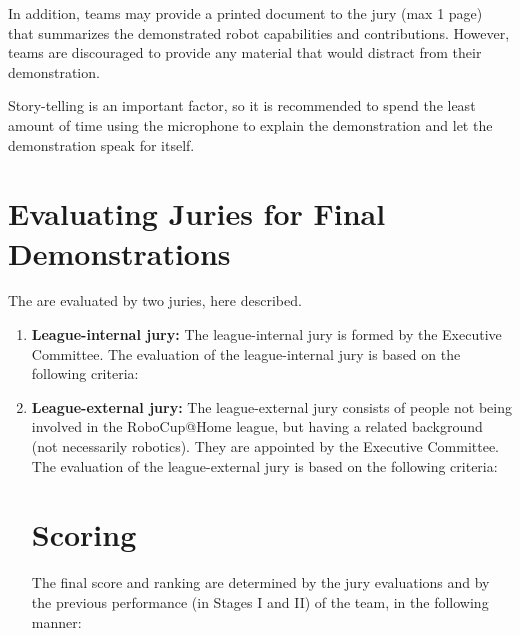 In addition, teams may provide a printed document to the jury (max 1 page) that summarizes the demonstrated robot capabilities and contributions. However, teams are discouraged to provide any material that would distract from their demonstration.

Story-telling is an important factor, so it is recommended to spend the least amount of time using the microphone to explain the demonstration and let the demonstration speak for itself.


\section{Evaluating Juries for Final Demonstrations}
The  are evaluated by two juries, here described.

\begin{enumerate}
\item\textbf{League-internal jury:} The league-internal jury is formed by the Executive Committee. The evaluation of the league-internal jury is based on the following criteria:

\item \textbf{League-external jury:} The league-external jury consists of people not being involved in the RoboCup@Home league, but having a related background (not necessarily robotics). They are appointed by the Executive Committee. The evaluation of the league-external jury is based on the following criteria:

\section{Scoring}
The final score and ranking are determined by the jury evaluations and by the previous performance (in Stages I and II) of the team, in the following manner:
  

\end{enumerate}
